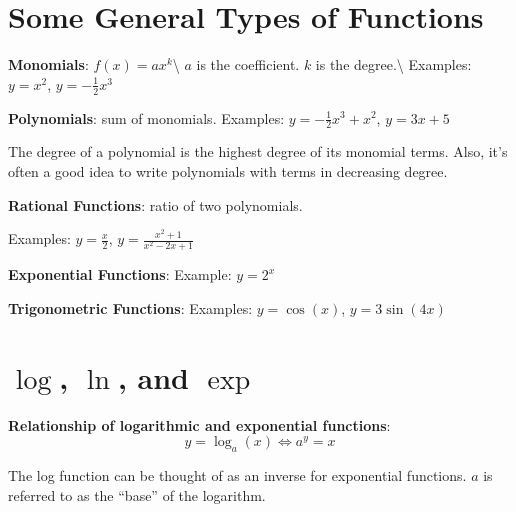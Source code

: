 \documentclass[]{book}
\theoremstyle{definition}
\theoremstyle{definition}
\theoremstyle{definition}
\theoremstyle{remark}
\begin{document}
\section{Some General Types of
Functions}\label{some-general-types-of-functions}

\textbf{Monomials}: \(f(x)=a x^k\)\textbackslash{} \(a\) is the
coefficient. \(k\) is the degree.\textbackslash{} Examples: \(y=x^2\),
\(y=-\frac{1}{2}x^3\)

\textbf{Polynomials}: sum of monomials. Examples:
\(y=-\frac{1}{2}x^3+x^2\), \(y=3x+5\)

The degree of a polynomial is the highest degree of its monomial terms.
Also, it's often a good idea to write polynomials with terms in
decreasing degree.

\textbf{Rational Functions}: ratio of two polynomials.

Examples: \(y=\frac{x}{2}\), \(y=\frac{x^2+1}{x^2-2x+1}\)

\textbf{Exponential Functions}: Example: \(y=2^x\)

\textbf{Trigonometric Functions}: Examples: \(y=\cos(x)\),
\(y=3\sin(4x)\)

\section{\texorpdfstring{\(\log\), \(\ln\), and
\(\exp\)}{\textbackslash{}log, \textbackslash{}ln, and \textbackslash{}exp}}\label{log-ln-and-exp}

\textbf{Relationship of logarithmic and exponential functions}:
\[y=\log_a(x) \iff a^y=x\]

The log function can be thought of as an inverse for exponential
functions. \(a\) is referred to as the ``base'' of the logarithm.
\end{document}
